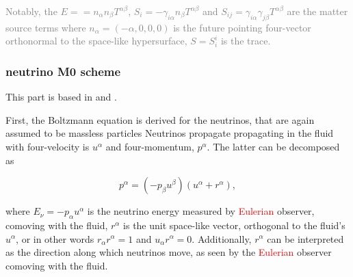 \documentclass[11pt,a4paper,headinclude=true,DIV=14,BCOR=8mm,chapterprefix,listof=totoc,twoside,openright,abstracton]{scrbook}
\newcommand{\red}[1]{\textcolor{red}{#1}}
\newcommand{\gray}[1]{\textcolor{gray}{#1}}
\begin{document}





\gray{
    Notably, the $E == n_{\alpha}n_{\beta}T^{\alpha\beta}$, 
    $S_i = -\gamma_{i\alpha}n_{\beta}T^{\alpha\beta}$ and $S_{ij} = \gamma_{i\alpha}\gamma_{j\beta}T^{\alpha\beta}$ are the matter source terms where $n_{\alpha}=(-\alpha, 0, 0, 0)$ is the future pointing four-vector orthonormal to the space-like hypersurface, $S=S_{i}^{i}$ is the trace.
}


\subsubsection{neutrino M0 scheme}


This part is based in \cite{Radice:2016dwd} and \cite{Radice:2018pdn}.

First, the Boltzmann equation is derived for the neutrinos, that are again
assumed to be massless particles
Neutrinos propagate propagating in the fluid
with four-velocity is $u^{\alpha}$ and four-momentum, $p^{\alpha}$.
The latter can be decomposed as \cite{Thorne:1981}

\begin{equation}
p^{\alpha} = (-p_{\beta}u^{\beta})(u^{\alpha} + r^{\alpha}),
\end{equation}

where $E_{\nu}=-p_{\alpha}u^{\alpha}$ is the neutrino energy measured by \red{Eulerian} observer,
comoving with the fluid, $r^{\alpha}$ is the unit space-like vector, orthogonal to the 
fluid's $u^{\alpha}$, or in other words $r_{\alpha}r^{\alpha}=1$ and $u_{\alpha}r^{\alpha}=0$.
Additionally, $r^{\alpha}$ can be interpreted as the direction along which neutrinos move,
as seen by the \red{Eulerian} observer comoving with the fluid.
\end{document}

